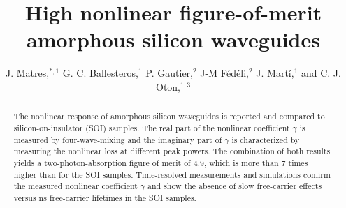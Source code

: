 \documentclass[10pt,letterpaper]{article}
\begin{document}
\title{High nonlinear figure-of-merit amorphous silicon waveguides}
\author{J. Matres,$^{*,1}$ G. C. Ballesteros,$^1$ P. Gautier,$^2$ J-M F\'ed\'eli,$^2$  J. Mart\'i,$^1$ and C. J. Oton,$^{1,3}$} 
\address{$^1$ Nanophotonics Technology Center, \\ Universidad Polit\'ecnica de Valencia, Camino de Vera s/n, 46022, Valencia, Spain\\
$^2$CEA LETI, Minatec Campus, Grenoble 38054, France\\
$^3$Current address: Scuola Superiore Sant'Anna, Via G. Moruzzi 1, 56124, Pisa, Italy}


\begin{abstract}
The nonlinear response of amorphous silicon waveguides is reported and compared to silicon-on-insulator (SOI) samples. The real part of the nonlinear coefficient $\gamma$ is measured by four-wave-mixing and the imaginary part of $\gamma$ is characterized by measuring the nonlinear loss at different peak powers. The combination of both results yields a two-photon-absorption figure of merit of 4.9, which is more than 7 times higher than for the SOI samples. Time-resolved measurements and simulations confirm the measured nonlinear coefficient $\gamma$ and show the absence of slow free-carrier effects versus ns free-carrier lifetimes in the SOI samples.
\end{abstract}





\end{document}
